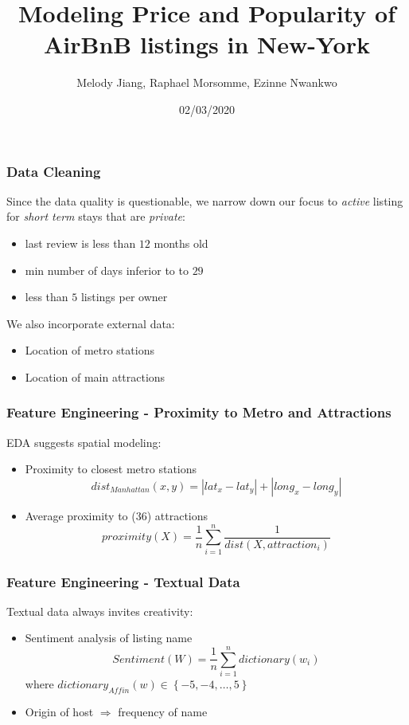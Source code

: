 \documentclass{beamer}
\title{Modeling Price and Popularity of AirBnB listings in New-York}
\author{Melody Jiang, Raphael Morsomme, Ezinne Nwankwo}
\institute{Department of Statistical Science, Duke University}
\date{02/03/2020}
\begin{document}
\frame{\titlepage}




\begin{frame}
\frametitle{Data Cleaning}
Since the data quality is questionable, we narrow down our focus to \textit{active} listing for \textit{short term} stays that are \textit{private}:

\begin{itemize}
	\item last review is less than $12$ months old
	\item min number of days inferior to to $29$
	\item less than $5$ listings per owner
\end{itemize}

We also incorporate external data:
\begin{itemize}
	\item Location of metro stations
	\item Location of main attractions
\end{itemize}
\end{frame}



\begin{frame}
\frametitle{Feature Engineering - Proximity to Metro and Attractions}
EDA suggests spatial modeling:
\begin{itemize}
	\item Proximity to closest metro stations
	$$dist_{Manhattan}(x, y) = |lat_{x} - lat_{y}| +  |long_{x} - long_{y}|$$
	\item Average proximity to ($36$) attractions
	$$proximity(X) = \dfrac{1}{n}\sum_{i=1}^{n} \dfrac{1}{dist(X, attraction_i)}
	$$
\end{itemize}
\end{frame}



\begin{frame}
\frametitle{Feature Engineering - Textual Data}
Textual data always invites creativity:
\begin{itemize}
	\item Sentiment analysis of listing name
	$$ Sentiment(W) = \dfrac{1}{n}\sum_{i=1}^{n} dictionary(w_i)$$
	where $dictionary_{Affin}(w) \in \left\lbrace -5, -4, \dots, 5\right\rbrace$
	\item Origin of host $\Rightarrow$ frequency of name
\end{itemize}
\end{frame}
\end{document}
